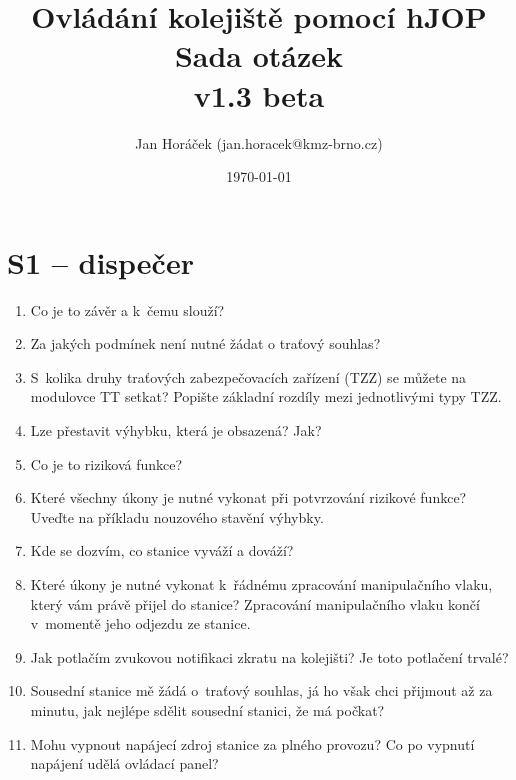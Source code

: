 \documentclass[12pt,a4paper]{article}
\begin{document}
\thispagestyle{empty}
\noindent

\title{
\Large Ovládání kolejiště pomocí hJOP\\
\LARGE Sada otázek\\
\small v1.3 beta}
\author{Jan Horáček (jan.horacek@kmz-brno.cz)}
\date{\today}
\maketitle

\section*{S1 – dispečer}

\begin{enumerate}[leftmargin=*]
	\item Co je to závěr a k~čemu slouží?
	
	\item Za jakých podmínek není nutné žádat o traťový souhlas?
	
	\item S~kolika druhy traťových zabezpečovacích zařízení (TZZ) se můžete na modulovce TT setkat? Popište základní rozdíly mezi jednotlivými typy TZZ.
	
	\item Lze přestavit výhybku, která je obsazená? Jak?
	
	\item Co je to riziková funkce?
	
	\item Které všechny úkony je nutné vykonat při potvrzování rizikové funkce? Uveďte na příkladu nouzového stavění výhybky.
	
	\item Kde se dozvím, co stanice vyváží a dováží?
	
	\item Které úkony je nutné vykonat k~řádnému zpracování manipulačního vlaku, který vám právě přijel do stanice? Zpracování manipulačního vlaku končí v~momentě jeho odjezdu ze stanice.
	
	\item Jak potlačím zvukovou notifikaci zkratu na kolejišti? Je toto potlačení trvalé?
	
	\item Sousední stanice mě žádá o~traťový souhlas, já ho však chci přijmout až za minutu, jak nejlépe sdělit sousední stanici, že má počkat?
	
	\item Mohu vypnout napájecí zdroj stanice za plného provozu? Co po vypnutí napájení udělá ovládací panel?
	

\end{enumerate}
\end{document}
